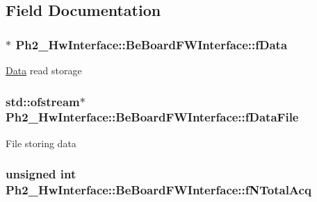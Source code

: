 \subsection{Field Documentation}
\hypertarget{class_ph2___hw_interface_1_1_be_board_f_w_interface_a9b315d4b61df34d093ed35cfef755a0f}{
\subsubsection[{f\-Data}]{$\ast$ Ph2\-\_\-\-Hw\-Interface\-::\-Be\-Board\-F\-W\-Interface\-::f\-Data}}\label{class_ph2___hw_interface_1_1_be_board_f_w_interface_a9b315d4b61df34d093ed35cfef755a0f}
\hyperlink{class_ph2___hw_interface_1_1_data}{Data} read storage \hypertarget{class_ph2___hw_interface_1_1_be_board_f_w_interface_afa2f1748f8a2d527961766449cd91386}{
\subsubsection[{f\-Data\-File}]{\setlength{\rightskip}{0pt plus 5cm}std\-::ofstream$\ast$ Ph2\-\_\-\-Hw\-Interface\-::\-Be\-Board\-F\-W\-Interface\-::f\-Data\-File}}\label{class_ph2___hw_interface_1_1_be_board_f_w_interface_afa2f1748f8a2d527961766449cd91386}
File storing data \hypertarget{class_ph2___hw_interface_1_1_be_board_f_w_interface_a9cc80365ec331732245553a8bc0024ab}{
\subsubsection[{f\-N\-Total\-Acq}]{\setlength{\rightskip}{0pt plus 5cm}unsigned int Ph2\-\_\-\-Hw\-Interface\-::\-Be\-Board\-F\-W\-Interface\-::f\-N\-Total\-Acq}}\label{class_ph2___hw_interface_1_1_be_board_f_w_interface_a9cc80365ec331732245553a8bc0024ab}
